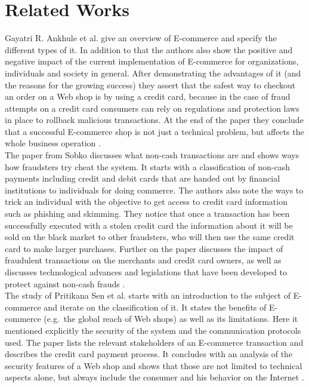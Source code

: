 
\chapter{Related Works}
\label{cha:related_works}

Gayatri R. Ankhule et al. give an overview of \gls{E-commerce} and specify the different types of it. In addition to that the authors also show the positive and negative impact of the current implementation of \gls{E-commerce} for organizations, individuals and society in general. After demonstrating the advantages of it (and the reasons for the growing success) they assert that the safest way to checkout an order on a Web shop is by using a credit card, because in the case of fraud attempts on a credit card consumers can rely on regulations and protection laws in place to rollback malicious transactions. At the end of the paper they conclude that a successful \gls{E-commerce} shop is not just a technical problem, but affects the whole business operation \citep{ankhule2015overview}. \\

The paper from Sobko discusses what non-cash transactions are and shows ways how fraudsters try cheat the system. It starts with a classification of non-cash payments including credit and debit cards that are handed out by financial institutions to individuals for doing commerce. The authors also note the ways to trick an individual with the objective to get access to credit card information such as phishing and skimming. They notice that once a transaction has been successfully executed with a stolen credit card the information about it will be sold on the black market to other fraudsters, who will then use the same credit card to make larger purchases. Further on the paper discusses the impact of fraudulent transactions on the merchants and credit card owners, as well as discusses technological advances and legislations that have been developed to protect against non-cash frauds \citep{sobko2014fraud}. \\

The study of Pritikana Sen et al. starts with an introduction to the subject of \gls{E-commerce} and iterate on the classification of it. It states the benefits of \gls{E-commerce} (e.g.\ the global reach of Web shops) as well as its limitations. Here it mentioned explicitly the security of the system and the communication protocols used. The paper lists the relevant stakeholders of an \gls{E-commerce} transaction and describes the credit card payment process. It concludes with an analysis of the security features of a Web shop and shows that those are not limited to technical aspects alone, but always include the consumer and his behavior on the Internet \citep{sen2015study}. \\

